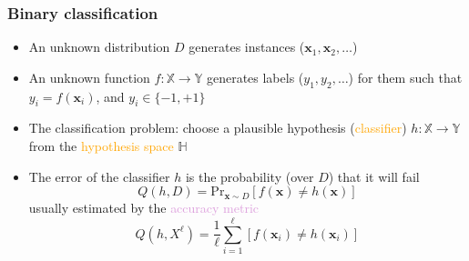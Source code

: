 \documentclass[usenames,dvipsnames,aspectratio=169]{beamer}
\begin{document}
\begin{frame}
\frametitle{Binary classification}

\begin{itemize}

\item An unknown distribution $D$
generates instances ($\mathbf{x}_1, \mathbf{x}_2, \ldots$)

\item An unknown function 
$f: \mathbb{X} \to \mathbb{Y}$ generates labels
($y_1, y_2, \ldots$) for them
such that $y_i = f(\mathbf{x}_i)$, and $y_i \in \{-1, +1\}$

\item The classification problem:
choose a plausible hypothesis (\textcolor{orange}{classifier})
$h: \mathbb{X} \to \mathbb{Y}$
from the \textcolor{orange}{hypothesis space} $\mathbb{H}$

\pause
\item The error of the classifier $h$ is 
the probability (over $D$) that it will fail
\[
Q(h, D) = \mathrm{Pr}_{\mathbf{x} \sim D} 
  [f(\mathbf{x}) \neq h(\mathbf{x})]
\]
usually estimated by the \textcolor{Plum}{accuracy metric}
\[
    Q(h, X^{\ell}) = \frac {1} {\ell} 
    \sum\limits_{i=1} ^{\ell} 
        [f(\mathbf{x}_i) \neq h(\mathbf{x}_i)]
\]
\end{itemize}

\end{frame}
\end{document}
